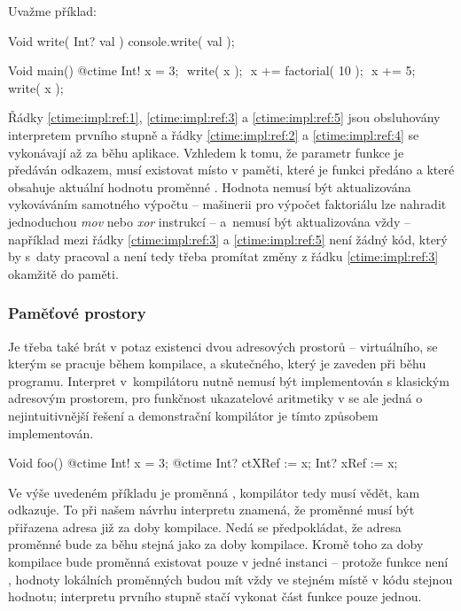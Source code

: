 Uvažme příklad:

\begin{code}
Void write( Int? val ) {
	console.write( val );
}
	
Void main() {
	@ctime Int! x = 3; $\label{ctime:impl:ref:1}$
	write( x ); $\label{ctime:impl:ref:2}$
	x += factorial( 10 ); $\label{ctime:impl:ref:3}$
	x += 5; $\label{ctime:impl:ref:5}$
	write( x ); $\label{ctime:impl:ref:4}$
}
\end{code}

Řádky \ref{ctime:impl:ref:1}, \ref{ctime:impl:ref:3} a \ref{ctime:impl:ref:5} jsou obsluhovány interpretem prvního stupně a řádky \ref{ctime:impl:ref:2} a \ref{ctime:impl:ref:4} se vykonávají až za běhu aplikace. Vzhledem k tomu, že parametr funkce  je předáván odkazem, musí existovat místo v paměti, které je funkci předáno a které obsahuje aktuální hodnotu proměnné . Hodnota nemusí být aktualizována vykováváním samotného výpočtu -- mašinerii pro výpočet faktoriálu lze nahradit jednoduchou \textit{mov} nebo \textit{xor} instrukcí -- a~nemusí být aktualizována vždy -- například mezi řádky \ref{ctime:impl:ref:3} a \ref{ctime:impl:ref:5} není žádný \nonctime kód, který by s~daty pracoval a není tedy třeba promítat změny z řádku \ref{ctime:impl:ref:3} okamžitě do paměti. 

\subsubsection{Paměťové prostory}
Je třeba také brát v potaz existenci dvou adresových prostorů -- virtuálního, se kterým se pracuje během kompilace, a skutečného, který je zaveden při běhu programu. Interpret v~kompilátoru nutně nemusí být implementován s klasickým adresovým prostorem, pro funkčnost ukazatelové aritmetiky v \ctime se ale jedná o nejintuitivnější řešení a demonstrační kompilátor je tímto způsobem implementován.

\begin{code}[\label{ctime:impl:ref:mem:1}]
Void foo() {
	@ctime Int! x = 3;
	@ctime Int? ctXRef := x;
	Int? xRef := x;
}
\end{code}

Ve výše uvedeném příkladu je proměnná  \ctime, kompilátor tedy musí vědět, kam odkazuje. To při našem návrhu interpretu znamená, že proměnné  musí být přiřazena adresa již za doby kompilace. Nedá se předpokládat, že adresa proměnné  bude za běhu stejná jako za doby kompilace. Kromě toho za doby kompilace bude proměnná  existovat pouze v jedné instanci -- protože funkce  není \ctime, hodnoty lokálních \ctime proměnných budou mít vždy ve stejném místě v kódu stejnou hodnotu; interpretu prvního stupně stačí vykonat \ctime část funkce pouze jednou.

